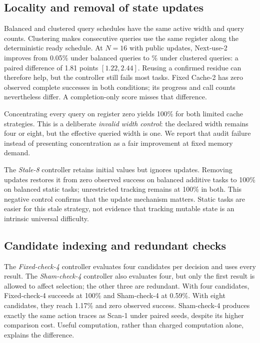 \documentclass[sigconf,nonacm]{acmart}
\begin{document}
\subsection{Locality and removal of state updates}
Balanced and clustered query schedules have the same active width and
query counts. Clustering makes consecutive queries use the same register
along the deterministic ready schedule. At $N=16$ with public updates,
Next-use-2 improves from 0.05\% under balanced queries to
\ClusterSuccess{}\% under clustered queries: a paired difference of
1.81 points $[1.22,2.44]$. Reusing a confirmed residue can therefore help,
but the controller still fails most tasks. Fixed Cache-2 has zero observed
complete successes in both conditions; its progress and call counts nevertheless
differ. A completion-only score misses that difference.

Concentrating every query on register zero yields 100\% for both limited
cache strategies. This is a deliberate \emph{invalid width control}:
the declared width remains four or eight, but the effective queried width
is one. We report that audit failure instead of presenting concentration
as a fair improvement at fixed memory demand.

The \emph{Stale-8} controller retains initial values but ignores updates.
Removing updates restores it from zero observed success on balanced
additive tasks to 100\% on balanced static tasks; unrestricted tracking
remains at 100\% in both. This negative control confirms that the update
mechanism matters. Static tasks are easier for this stale strategy, not
evidence that tracking mutable state is an intrinsic universal difficulty.

\subsection{Candidate indexing and redundant checks}
\begin{table}[t]
\centering\small

\caption{Selection ablation with full snapshots. Checks per call are the
aggregate comparison count divided by execution calls. Build entries
charge candidate-table preparation separately; lookup calls are separate
operations, not equivalent CPU-time units. Early termination changes
total comparisons, so only the fixed and redundant controls match
comparison counts per decision.}
\label{tab:selectionresources}
\end{table}

The \emph{Fixed-check-4} controller evaluates four candidates per decision
and uses every result. The \emph{Sham-check-4} controller also evaluates
four, but only the first result is allowed to affect selection; the other
three are redundant. With four candidates, Fixed-check-4 succeeds at
100\% and Sham-check-4 at 0.59\%. With eight candidates, they reach
1.17\% and zero observed success. Sham-check-4 produces exactly the same
action traces as Scan-1 under paired seeds, despite its higher comparison
cost. Useful computation, rather than charged computation alone, explains
the difference.
\end{document}
